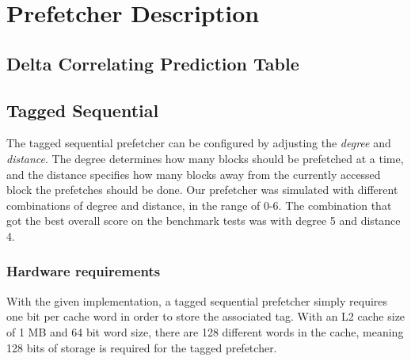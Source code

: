 \section{Prefetcher Description}


\subsection{Delta Correlating Prediction Table}

\subsection{Tagged Sequential}

The tagged sequential prefetcher 
can be configured by adjusting the \emph{degree} and \emph{distance}. The degree
determines how many blocks should be prefetched at a time, and the distance
specifies how many blocks away from the currently accessed block the prefetches
should be done. Our prefetcher was simulated with different combinations of 
degree and distance, in the range of 0-6. The combination that got the best 
overall score on the benchmark tests was with degree 5 and distance 4.

\subsubsection{Hardware requirements}

With the given implementation, a tagged sequential prefetcher simply requires
one bit per cache word in order to store the associated tag. With an L2 cache
size of 1 MB and 64 bit word size, there are 128 different words in the cache,
meaning 128 bits of storage is required for the tagged prefetcher.
